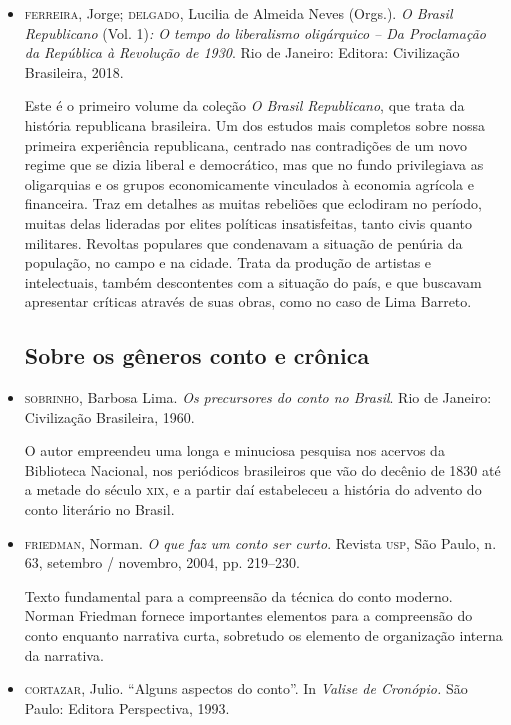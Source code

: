 \documentclass[11pt]{extarticle}
\begin{document}
{{\begin{itemize}
\item  \textsc{ferreira}, Jorge; \textsc{delgado}, Lucilia de Almeida Neves (Orgs.). \emph{O
Brasil Republicano} (Vol. 1)\emph{: O tempo do liberalismo oligárquico
-- Da Proclamação da República à Revolução de 1930}. Rio de Janeiro:
Editora: Civilização Brasileira, 2018. 

Este é o primeiro volume da
coleção \emph{O Brasil Republicano}, que trata da história republicana
brasileira. Um dos estudos mais completos sobre nossa primeira
experiência republicana, centrado nas contradições de um novo regime que
se dizia liberal e democrático, mas que no fundo privilegiava as
oligarquias e os grupos economicamente vinculados à economia agrícola e
financeira. Traz em detalhes as muitas rebeliões que eclodiram no
período, muitas delas lideradas por elites políticas insatisfeitas,
tanto civis quanto militares. Revoltas populares que condenavam a
situação de penúria da população, no campo e na cidade. Trata da
produção de artistas e intelectuais, também descontentes com a situação
do país, e que buscavam apresentar críticas através de suas obras, como
no caso de Lima Barreto.

\subsection{Sobre os gêneros conto e crônica}

\item \textsc{sobrinho}, Barbosa Lima. \emph{Os precursores do conto no Brasil}. Rio de
Janeiro: Civilização Brasileira, 1960. 

O autor empreendeu uma longa e
minuciosa pesquisa nos acervos da Biblioteca Nacional, nos periódicos
brasileiros que vão do decênio de 1830 até a metade do século \textsc{xix}, e a
partir daí estabeleceu a história do advento do conto literário no
Brasil.

\item \textsc{friedman}, Norman. \emph{O que faz um conto ser curto}. Revista \textsc{usp}, São
Paulo, n. 63, setembro / novembro, 2004, pp. 219--230. 

Texto
fundamental para a compreensão da técnica do conto moderno. Norman
Friedman fornece importantes elementos para a compreensão do conto
enquanto narrativa curta, sobretudo os elemento de organização interna
da narrativa.

\item \textsc{cortazar}, Julio. ``Alguns aspectos do conto''. In \emph{Valise de
Cronópio.} São Paulo: Editora Perspectiva, 1993. 


\end{itemize}}}
\end{document}
